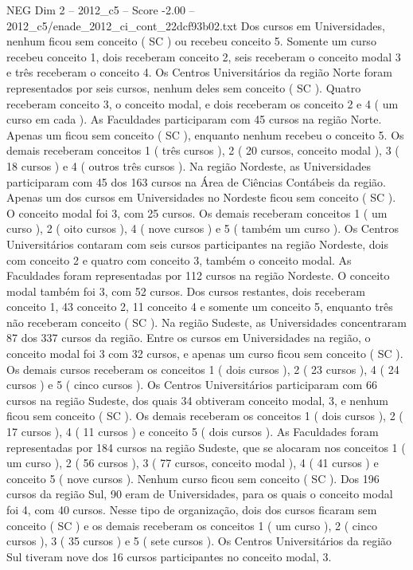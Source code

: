 \begin{textsample}{NEG Dim 2 – 2012\_c5 – Score -2.00 – 2012\_c5/enade\_2012\_ci\_cont\_22dcf93b02.txt}
Dos cursos em Universidades, nenhum ficou sem conceito ( SC ) ou recebeu conceito 5.
Somente um curso recebeu conceito 1, dois receberam conceito 2, seis receberam o conceito modal 3 e três receberam o conceito 4.
Os Centros Universitários da região Norte foram representados por seis cursos, nenhum deles sem conceito ( SC ).
Quatro receberam conceito 3, o conceito modal, e dois receberam os conceito 2 e 4 ( um curso em cada ).
As Faculdades participaram com 45 cursos na região Norte.
Apenas um ficou sem conceito ( SC ), enquanto nenhum recebeu o conceito 5.
Os demais receberam conceitos 1 ( três cursos ), 2 ( 20 cursos, conceito modal ), 3 ( 18 cursos ) e 4 ( outros três cursos ).
Na região Nordeste, as Universidades participaram com 45 dos 163 cursos na Área de Ciências Contábeis da região.
Apenas um dos cursos em Universidades no Nordeste ficou sem conceito ( SC ).
O conceito modal foi 3, com 25 cursos.
Os demais receberam conceitos 1 ( um curso ), 2 ( oito cursos ), 4 ( nove cursos ) e 5 ( também um curso ).
Os Centros Universitários contaram com seis cursos participantes na região Nordeste, dois com conceito 2 e quatro com conceito 3, também o conceito modal.
As Faculdades foram representadas por 112 cursos na região Nordeste.
O conceito modal também foi 3, com 52 cursos.
Dos cursos restantes, dois receberam conceito 1, 43 conceito 2, 11 conceito 4 e somente um conceito 5, enquanto três não receberam conceito ( SC ).
Na região Sudeste, as Universidades concentraram 87 dos 337 cursos da região.
Entre os cursos em Universidades na região, o conceito modal foi 3 com 32 cursos, e apenas um curso ficou sem conceito ( SC ).
Os demais cursos receberam os conceitos 1 ( dois cursos ), 2 ( 23 cursos ), 4 ( 24 cursos ) e 5 ( cinco cursos ).
Os Centros Universitários participaram com 66 cursos na região Sudeste, dos quais 34 obtiveram conceito modal, 3, e nenhum ficou sem conceito ( SC ).
Os demais receberam os conceitos 1 ( dois cursos ), 2 ( 17 cursos ), 4 ( 11 cursos ) e conceito 5 ( dois cursos ).
As Faculdades foram representadas por 184 cursos na região Sudeste, que se alocaram nos conceitos 1 ( um curso ), 2 ( 56 cursos ), 3 ( 77 cursos, conceito modal ), 4 ( 41 cursos ) e conceito 5 ( nove cursos ).
Nenhum curso ficou sem conceito ( SC ).
Dos 196 cursos da região Sul, 90 eram de Universidades, para os quais o conceito modal foi 4, com 40 cursos.
Nesse tipo de organização, dois dos cursos ficaram sem conceito ( SC ) e os demais receberam os conceitos 1 ( um curso ), 2 ( cinco cursos ), 3 ( 35 cursos ) e 5 ( sete cursos ).
Os Centros Universitários da região Sul tiveram nove dos 16 cursos participantes no conceito modal, 3.

\end{textsample}
